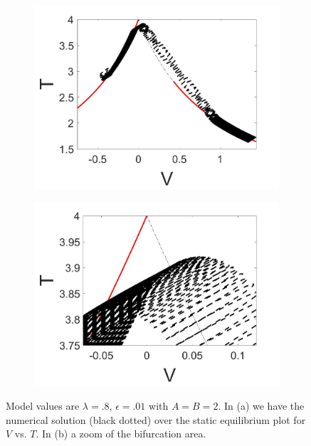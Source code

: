\begin{figure}[H]
\centering
\begin{subfigure}{.5\textwidth}
 \centering
 \includegraphics[width=\linewidth]{twoD/slowosc_Tplot_small.jpg}
 \caption{}
\end{subfigure}%
\begin{subfigure}{.5\textwidth}
 \centering
 \includegraphics[width=\linewidth]{twoD/slowosc_Tplot_small_zoom.jpg}
 \caption{}
\end{subfigure}
\caption{Model values are $\lambda=.8$, $\epsilon=.01$ with $A=B=2$. In (a) we have the numerical solution (black dotted) over the static equilibrium plot for $V$ vs. $T$. In (b) a zoom of the bifurcation area.}
\label{fig:twoD_slowosc_Tnumerics_small}
\end{figure}

